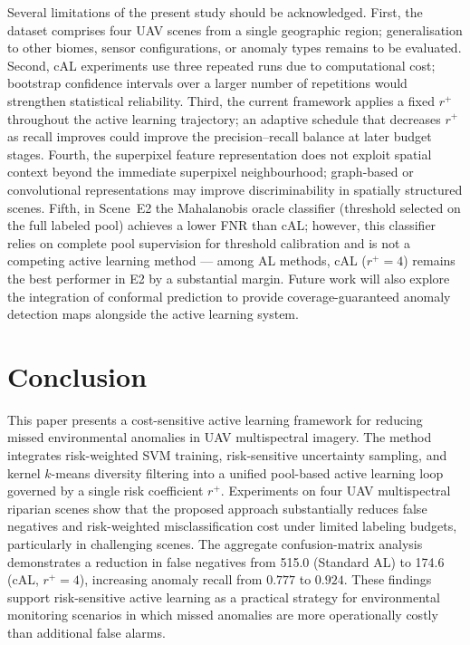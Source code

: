 \documentclass[lettersize,journal]{IEEEtran}
\begin{document}
Several limitations of the present study should be acknowledged.
First, the dataset comprises four UAV scenes from a single geographic
region; generalisation to other biomes, sensor configurations, or anomaly
types remains to be evaluated. Second, cAL experiments use three repeated
runs due to computational cost; bootstrap confidence intervals over a
larger number of repetitions would strengthen statistical reliability.
Third, the current framework applies a fixed $r^{+}$ throughout the
active learning trajectory; an adaptive schedule that decreases $r^{+}$
as recall improves could improve the precision--recall balance at later
budget stages. Fourth, the superpixel feature representation does not
exploit spatial context beyond the immediate superpixel neighbourhood;
graph-based or convolutional representations may improve discriminability
in spatially structured scenes. Fifth, in Scene~E2 the Mahalanobis oracle
classifier (threshold selected on the full labeled pool) achieves a lower
FNR than cAL; however, this classifier relies on complete pool supervision
for threshold calibration and is not a competing active learning method ---
among AL methods, cAL ($r^{+}=4$) remains the best performer in E2 by a
substantial margin. Future work will also explore the
integration of conformal prediction to provide coverage-guaranteed
anomaly detection maps alongside the active learning system.

\section{Conclusion}

This paper presents a cost-sensitive active learning framework for
reducing missed environmental anomalies in UAV multispectral imagery.
The method integrates risk-weighted SVM training, risk-sensitive
uncertainty sampling, and kernel $k$-means diversity filtering into a
unified pool-based active learning loop governed by a single risk
coefficient $r^{+}$. Experiments on four UAV multispectral riparian
scenes show that the proposed approach substantially reduces false
negatives and risk-weighted misclassification cost under limited
labeling budgets, particularly in challenging scenes. The aggregate
confusion-matrix analysis demonstrates a reduction in false negatives
from 515.0 (Standard AL) to 174.6 (cAL, $r^{+}=4$), increasing anomaly
recall from $0.777$ to $0.924$. These findings support risk-sensitive
active learning as a practical strategy for environmental monitoring
scenarios in which missed anomalies are more operationally costly than
additional false alarms.
\end{document}
